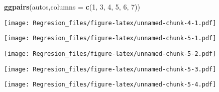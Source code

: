 \documentclass[]{article}
\newenvironment{Shaded}{\begin{snugshade}}{\end{snugshade}}
\newcommand{\DataTypeTok}[1]{\textcolor[rgb]{0.13,0.29,0.53}{#1}}
\newcommand{\DecValTok}[1]{\textcolor[rgb]{0.00,0.00,0.81}{#1}}
\newcommand{\KeywordTok}[1]{\textcolor[rgb]{0.13,0.29,0.53}{\textbf{#1}}}
\newcommand{\NormalTok}[1]{#1}
\newcommand{\OperatorTok}[1]{\textcolor[rgb]{0.81,0.36,0.00}{\textbf{#1}}}
\newcommand{\StringTok}[1]{\textcolor[rgb]{0.31,0.60,0.02}{#1}}
\begin{document}
\begin{Shaded}
\begin{Highlighting}[]
\KeywordTok{ggpairs}\NormalTok{(autos,}\DataTypeTok{columns =} \KeywordTok{c}\NormalTok{(}\DecValTok{1}\NormalTok{, }\DecValTok{3}\NormalTok{, }\DecValTok{4}\NormalTok{, }\DecValTok{5}\NormalTok{, }\DecValTok{6}\NormalTok{, }\DecValTok{7}\NormalTok{))}
\end{Highlighting}
\end{Shaded}

\texttt{[image: Regresion\_files/figure-latex/unnamed-chunk-4-1.pdf]}

\begin{Shaded}
\end{Shaded}

\texttt{[image: Regresion\_files/figure-latex/unnamed-chunk-5-1.pdf]}

\begin{Shaded}
\end{Shaded}

\texttt{[image: Regresion\_files/figure-latex/unnamed-chunk-5-2.pdf]}

\begin{Shaded}
\end{Shaded}

\texttt{[image: Regresion\_files/figure-latex/unnamed-chunk-5-3.pdf]}

\begin{Shaded}
\end{Shaded}

\texttt{[image: Regresion\_files/figure-latex/unnamed-chunk-5-4.pdf]}

\begin{Shaded}
\end{Shaded}
\end{document}

